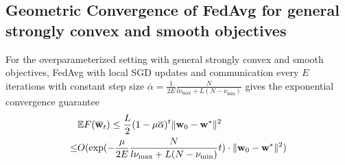 
\subsection{Geometric Convergence of FedAvg for general strongly convex and smooth objectives}

\begin{thm}
	For the overparameterized setting with general strongly convex and
	smooth objectives, FedAvg with local SGD updates and communication
	every $E$ iterations with constant step size $\overline{\alpha}=\frac{1}{2E}\frac{N}{l\nu_{\max}+L(N-\nu_{\min})}$
	gives the exponential convergence guarantee 
	\begin{align*}
	& \mathbb{E}F({\overline{\mathbf{w}}}_{t}) \leq\frac{L}{2}(1-\mu\overline{\alpha})^{t}\|{\mathbf{w}}_{0}-{\mathbf{w}}^{\ast}\|^{2}\\
	\leq &O(\exp(-\frac{\mu}{2E}\frac{N}{l\nu_{\max}+L(N-\nu_{\min})}t)\cdot\|{\mathbf{w}}_{0}-{\mathbf{w}}^{\ast}\|^{2})
	\end{align*}
\end{thm}
%
